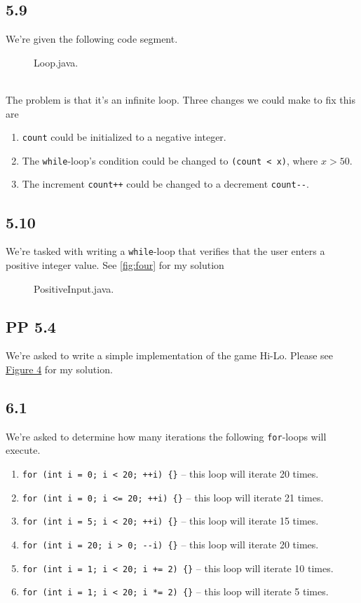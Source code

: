 \documentclass[leqno, 11pt]{article}
\newcommand{\iftcodefigure}[3]{%
  \begin{codefigure}
    \label{#1}
    \addtocounter{figure}{-1}
    
  \end{codefigure}
}
\begin{document}
\subsection*{5.9}
We're given the following code segment.
\begin{figure}[h!]
  \centering
  
  \caption{Loop.java.}
  \label{fig:three}
\end{figure}\\
The problem is that it's an infinite loop. Three changes we could make to fix this are
\begin{enumerate}
  \item \texttt{count} could be initialized to a negative integer.
  \item The \texttt{while}-loop's condition could be changed to \texttt{(count < x)}, where $x>50$.
  \item The increment \texttt{count++} could be changed to a decrement \verb|count--|.
\end{enumerate}
\subsection*{5.10}
We're tasked with writing a \texttt{while}-loop that verifies that the user enters a positive integer value. See \autoref{fig:four} for my solution
\begin{figure}[h!]
  \centering
  
  \caption{PositiveInput.java.}
  \label{fig:four}
\end{figure}
\subsection*{PP 5.4}
We're asked to write a simple implementation of the game Hi-Lo. Please see \hyperref[fig:five]{Figure 4} for my solution.
\iftcodefigure{fig:five}{HiLo.java}{/home/brandon/eclipse-workspace/ift_194_hw/src/hw_2/HiLo.java}
\subsection*{6.1}
We're asked to determine how many iterations the following \texttt{for}-loops will execute.
\begin{enumerate}[label=\alph*.]
  \itemsep-0.3em
  \item \texttt{for (int i = 0; i < 20; ++i) \{\}} -- this loop will iterate 20 times.
  \item \texttt{for (int i = 0; i <= 20; ++i) \{\}} -- this loop will iterate 21 times.
  \item \texttt{for (int i = 5; i < 20; ++i) \{\}} -- this loop will iterate 15 times.
  \item \verb|for (int i = 20; i > 0; --i) {}| -- this loop will iterate 20 times.
  \item \texttt{for (int i = 1; i < 20; i += 2) \{\}} -- this loop will iterate 10 times.
  \item \texttt{for (int i = 1; i < 20; i *= 2) \{\}} -- this loop will iterate 5 times.
\end{enumerate}
\end{document}
